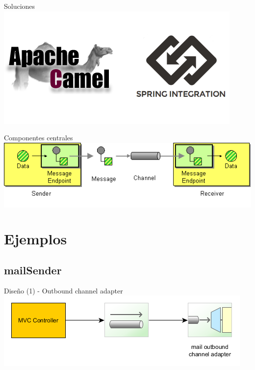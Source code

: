 \documentclass{beamer}
\begin{document}
\begin{frame}{Soluciones}
\includegraphics[width= 0.9\linewidth]{camel-spring}
\end{frame}

\begin{frame}{Componentes centrales}
\includegraphics[width=1.0\linewidth]{MessageEndpointSolution}
\end{frame}

\section{Ejemplos}
\subsection{mailSender}

\begin{frame}{Diseño (1) - Outbound channel adapter}
\includegraphics[width=1.0\linewidth]{sp-int-01}
\end{frame}
\end{document}

